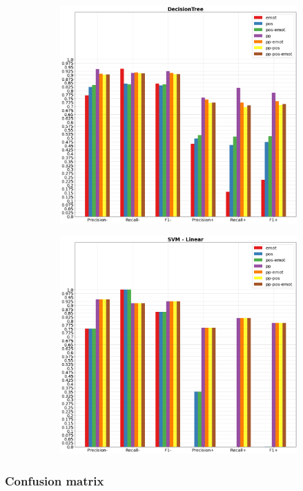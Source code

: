 \documentclass[oneside]{book}
\begin{document}
\begin{figure}[!h]
	\hspace*{-3cm}
	\begin{subfigure}[b]{0.5\textwidth}
		\centering
		\includegraphics[width=10cm]{assets/reports/micro/nobow/DecisionTree.png}
	\end{subfigure}
	\hfill
	\begin{subfigure}[b]{0.5\textwidth}
		\centering
		\hspace*{0.15cm}
		\includegraphics[width=10cm]{assets/reports/micro/nobow/SVM - Linear.png}
	\end{subfigure}
\end{figure}

\vfill
\restoregeometry

\newpage
{}
\subsubsection{Confusion matrix}
\end{document}
